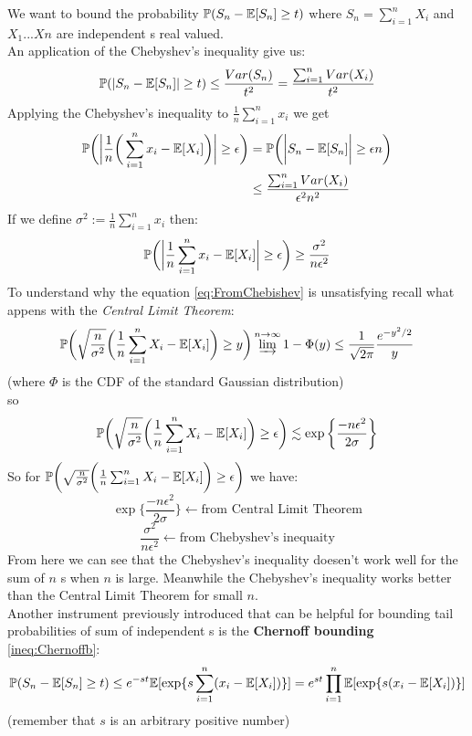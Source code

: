 We want to bound the probability $\mathbb{P}(S_n-\mathbb{E}[S_n]\geq t)$ where $S_n=\sum_{i=1}^{n} X_i$ and $X_1...Xn$ are independent \rv s real valued.\\
An application of the Chebyshev's inequality give us:
$$\mathbb{P}(|S_n-\mathbb{E}[S_n]|\geq t)\leq \frac{Var(S_n)}{t^2}=\frac{\sum_{i=1}^{n}Var(X_i)}{t^2}$$
Applying the Chebyshev's inequality to $ \frac{1}{n} \sum_{i=1}^{n}x_i$ we get
\[
\begin{split}
\mathbb{P}\bigg( \bigg| \frac{1}{n} \bigg( \sum_{i=1}^{n}x_i - \mathbb{E} [X_i] \bigg) \bigg| \geq \epsilon \bigg)
&=\mathbb{P}\bigg( \bigg| S_n - \mathbb{E} [S_n] \bigg| \geq \epsilon n \bigg)\\
&\leq \frac{\sum_{i=1}^{n}Var(X_i)}{\epsilon^2 n^2}
\end{split}
\]
If we define $\sigma^2 :=\frac{1}{n}\sum_{i=1}^{n}x_i$ then:
\begin{equation} \label{eq:FromChebishev}
	\mathbb{P}\bigg( \bigg| \frac{1}{n} \sum_{i=1}^{n}x_i - \mathbb{E} [X_i] \bigg| \geq \epsilon \bigg)\geq \frac{\sigma^2}{n\epsilon^2}
\end{equation}
To understand why the equation \ref{eq:FromChebishev} is unsatisfying recall what appens with the \textit{Central Limit Theorem}:
$$\mathbb{P}\bigg(\sqrt{\frac{n}{\sigma^2}}\bigg( \frac{1}{n}\sum_{i=1}^{n} X_i -\mathbb{E}[X_i] \bigg) \geq y \bigg) \varinjlim^{n\to \infty} 1- \Phi(y)\leq \frac{1}{\sqrt{2\pi}}\frac{e^{-y^2/2}}{y}$$
(where $\Phi$ is the CDF of the standard Gaussian distribution)\\
so
$$\mathbb{P}\bigg(\sqrt{\frac{n}{\sigma^2}}\bigg( \frac{1}{n}\sum_{i=1}^{n} X_i -\mathbb{E}[X_i] \bigg) \geq \epsilon  \bigg)\lesssim \exp\bigg\{ \frac{-n\epsilon^2}{2\sigma} \bigg\}$$
So for $\mathbb{P}\bigg(\sqrt{\frac{n}{\sigma^2}}\bigg( \frac{1}{n}\sum_{i=1}^{n} X_i -\mathbb{E}[X_i] \bigg) \geq \epsilon \bigg)$ we have:
$$\exp\bigg\{ \frac{-n\epsilon^2}{2\sigma} \bigg\}\leftarrow \text{from Central Limit Theorem}$$
$$\frac{\sigma^2}{n\epsilon^2}\leftarrow \text{from Chebyshev's inequaity}$$
From here we can see that the Chebyshev's inequality doesen't work well for the sum of $n$ \rv s when $n$ is large. Meanwhile the Chebyshev's inequality works better than the Central Limit Theorem for small $n$.\\

Another instrument previously introduced that can be helpful for bounding tail probabilities of sum of independent \rv s is the \textbf{Chernoff bounding} \ref{ineq:Chernoffb}:
\begin{equation}
\label{eq:ChernoffSum}
\mathbb{P}(S_n-\mathbb{E}[S_n]\geq t)\leq e^{-st}\mathbb{E}[\exp \{ s \sum_{i=1}^{n} (x_i-\mathbb{E}[X_i]) \}]=e^{st} \prod_{i=1}^{n}\mathbb{E}[\exp \{ s(x_i-\mathbb{E}[X_i]) \}]	
\end{equation}
(remember that $s$ is an arbitrary positive number)

